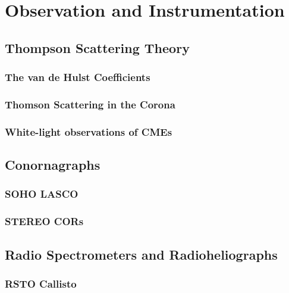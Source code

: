

\chapter{Observation and Instrumentation} 
\label{chap:3}

\section{Thompson Scattering Theory}\label{sec:1}

\subsection{The van de Hulst Coefficients}\label{sec:10}

\subsection{Thomson Scattering in the Corona}\label{sec:11}

\subsection{White-light observations of CMEs}\label{sec:12}


\section{Conornagraphs}\label{sec:2}

\subsection{SOHO LASCO}\label{sec:20}

\subsection{STEREO CORs}\label{sec:21}



\section{Radio Spectrometers and Radioheliographs}\label{sec:3}

\subsection{RSTO Callisto}\label{sec:30}


